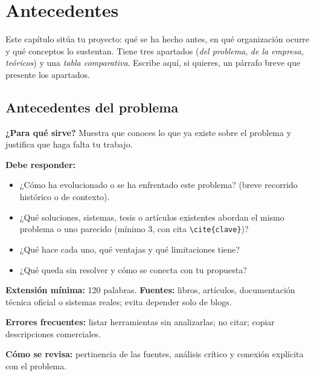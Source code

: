 
\section{Antecedentes} \label{sec:antecedentes}

\begin{guia}
Este capítulo sitúa tu proyecto: qué se ha hecho antes, en qué organización ocurre y qué conceptos lo sustentan.
Tiene tres apartados (\emph{del problema}, \emph{de la empresa}, \emph{teóricos}) y una \emph{tabla comparativa}.
Escribe aquí, si quieres, un párrafo breve que presente los apartados.
\end{guia}

\subsection{Antecedentes del problema} \label{sec:antecedentes_problema} %

\begin{guia}
\textbf{¿Para qué sirve?} Muestra que conoces lo que ya existe sobre el problema y justifica que haga falta tu trabajo.

\textbf{Debe responder:}
\begin{itemize}[nosep,leftmargin=*]
  \item ¿Cómo ha evolucionado o se ha enfrentado este problema? (breve recorrido histórico o de contexto).
  \item ¿Qué soluciones, sistemas, tesis o artículos existentes abordan el mismo problema o uno parecido (mínimo 3, con
        cita \verb|\cite{clave}|)?
  \item ¿Qué hace cada uno, qué ventajas y qué limitaciones tiene?
  \item ¿Qué queda sin resolver y cómo se conecta con tu propuesta?
\end{itemize}

\textbf{Extensión mínima:} 120 palabras. \textbf{Fuentes:} libros, artículos, documentación técnica oficial o sistemas
reales; evita depender solo de blogs.

\textbf{Errores frecuentes:} listar herramientas sin analizarlas; no citar; copiar descripciones comerciales.

\textbf{Cómo se revisa:} pertinencia de las fuentes, análisis crítico y conexión explícita con el problema.
\end{guia}

